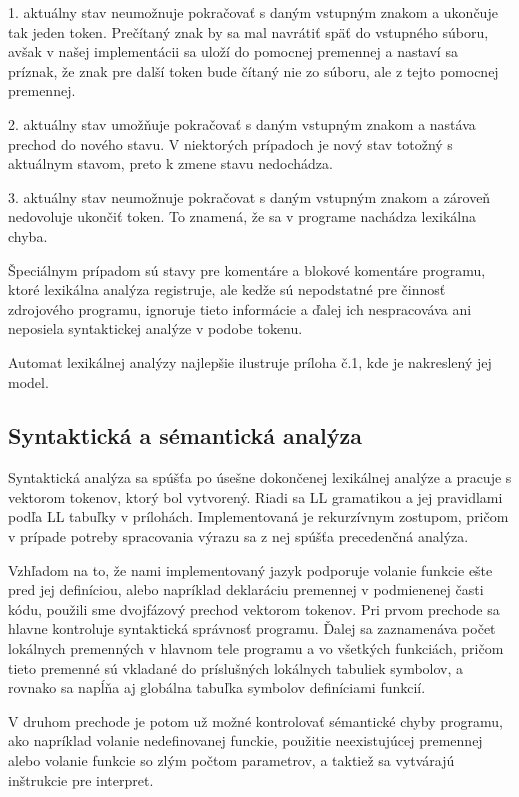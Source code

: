 \documentclass[12pt,a4paper,titlepage,final]{article}
\begin{document}
1. aktuálny stav neumožnuje pokračovať s daným vstupným znakom a ukončuje tak
jeden token. Prečítaný znak by sa mal navrátiť späť do vstupného súboru, avšak v našej
implementácii sa uloží do pomocnej premennej a nastaví sa príznak, že znak pre
další token bude čítaný nie zo súboru, ale z tejto pomocnej premennej.

2. aktuálny stav umožňuje pokračovať s daným vstupným znakom a nastáva prechod do nového stavu.
V niektorých prípadoch je nový stav totožný s aktuálnym stavom, preto k zmene stavu nedochádza.

3. aktuálny stav neumožnuje pokračovat s daným vstupným znakom a zároveň
nedovoluje ukončiť token. To znamená, že sa v programe nachádza lexikálna chyba.

Špeciálnym prípadom sú stavy pre komentáre a blokové komentáre programu, ktoré
lexikálna analýza registruje, ale kedže sú nepodstatné pre činnosť zdrojového
programu, ignoruje tieto informácie a ďalej ich nespracováva ani neposiela
syntaktickej analýze v podobe tokenu.

Automat lexikálnej analýzy najlepšie ilustruje príloha č.1, kde je nakreslený jej model.

\subsection{Syntaktická a sémantická analýza}
Syntaktická analýza sa spúšťa po úsešne dokončenej lexikálnej analýze a pracuje s vektorom tokenov,
ktorý bol vytvorený. Riadi sa LL gramatikou a jej pravidlami podľa LL tabuľky v prílohách.
Implementovaná je rekurzívnym zostupom, pričom v prípade potreby spracovania výrazu sa
z nej spúšťa precedenčná analýza.

Vzhľadom na to, že nami implementovaný jazyk podporuje volanie funkcie ešte pred
jej definíciou, alebo napríklad deklaráciu premennej v podmienenej časti kódu,
použili sme dvojfázový prechod vektorom tokenov. Pri prvom prechode sa hlavne kontroluje syntaktická
správnosť programu. Ďalej sa zaznamenáva počet lokálnych premenných v hlavnom tele programu a vo 
všetkých funkciách, pričom tieto premenné sú vkladané do príslušných lokálnych tabuliek symbolov, a rovnako
sa napĺňa aj globálna tabuľka symbolov definíciami funkcií.

V druhom prechode je potom už možné kontrolovať sémantické chyby programu, ako napríklad volanie
nedefinovanej funckie, použitie neexistujúcej premennej alebo volanie funkcie so zlým počtom parametrov,
a taktiež sa vytvárajú inštrukcie pre interpret.
\end{document}
